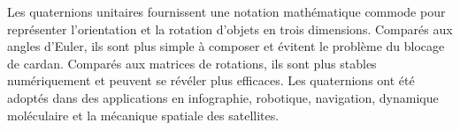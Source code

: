 Les quaternions unitaires fournissent une notation mathématique commode pour 
représenter l'orientation et la rotation d'objets en trois dimensions. 
Comparés aux angles d'Euler, ils sont plus simple à composer et évitent le problème 
du blocage de cardan. Comparés aux matrices de rotations, ils sont plus stables numériquement et peuvent se révéler plus efficaces. Les quaternions ont été adoptés 
dans des applications en infographie, robotique, navigation, dynamique moléculaire 
et la mécanique spatiale des satellites.